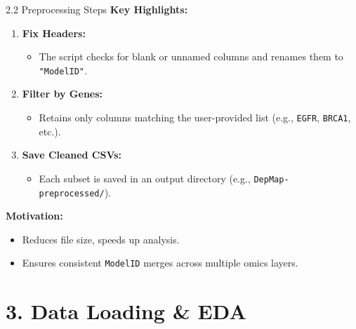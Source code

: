 \documentclass[10pt]{beamer}
\begin{document}
\begin{frame}{2.2 Preprocessing Steps}
  \textbf{Key Highlights:}
  \begin{enumerate}
    \item \textbf{Fix Headers:} 
      \begin{itemize}
        \item The script checks for blank or unnamed columns and renames them to \texttt{"ModelID"}.
      \end{itemize}
    \item \textbf{Filter by Genes:} 
      \begin{itemize}
        \item Retains only columns matching the user-provided list (e.g., \texttt{EGFR}, \texttt{BRCA1}, etc.).
      \end{itemize}
    \item \textbf{Save Cleaned CSVs:} 
      \begin{itemize}
        \item Each subset is saved in an output directory (e.g., \texttt{DepMap-preprocessed/}).
      \end{itemize}
  \end{enumerate}

  \vspace{0.3cm}
  \textbf{Motivation:}
  \begin{itemize}
    \item Reduces file size, speeds up analysis.
    \item Ensures consistent \texttt{ModelID} merges across multiple omics layers.
  \end{itemize}
\end{frame}

\section{3. Data Loading \& EDA}
\end{document}
